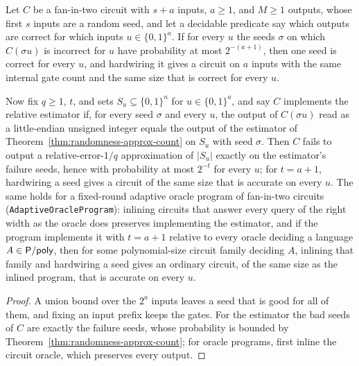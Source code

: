 \begin{corollary}
  \label{cor:randomness-approx-count-hardwire}
  \leanok
  Let $C$ be a fan-in-two circuit with $s + a$ inputs, $a \ge 1$, and $M \ge 1$
  outputs, whose first $s$ inputs are a random seed, and let a decidable
  predicate say which outputs are correct for which inputs
  $u \in \{0,1\}^a$. If for every $u$ the seeds $\sigma$ on which $C(\sigma u)$
  is incorrect for $u$ have probability at most $2^{-(a+1)}$, then one seed is
  correct for every $u$, and hardwiring it gives a circuit on $a$ inputs with
  the same internal gate count and the same size that is correct for every
  $u$.

  Now fix $q \ge 1$, $t$, and sets $S_u \subseteq \{0,1\}^n$ for
  $u \in \{0,1\}^a$, and say $C$ implements the relative estimator if, for
  every seed $\sigma$ and every $u$, the output of $C(\sigma u)$ read as a
  little-endian unsigned integer equals the output of the estimator of
  Theorem~\ref{thm:randomness-approx-count} on $S_u$ with seed $\sigma$. Then
  $C$ fails to output a relative-error-$1/q$ approximation of $|S_u|$ exactly on
  the estimator's failure seeds, hence with probability at most $2^{-t}$ for
  every $u$; for $t = a + 1$, hardwiring a seed gives a circuit of the same size
  that is accurate on every $u$. The same holds for a fixed-round adaptive
  oracle program of fan-in-two circuits (\texttt{AdaptiveOracleProgram}):
  inlining circuits that answer every query of the right width as the oracle
  does preserves implementing the estimator, and if the program implements it
  with $t = a + 1$ relative to every oracle deciding a language
  $A \in \mathsf{P/poly}$, then for some polynomial-size circuit family deciding
  $A$, inlining that family and hardwiring a seed gives an ordinary circuit,
  of the same size as the inlined program, that is accurate on every $u$.
\end{corollary}
\begin{proof}
  \leanok
  A union bound over the $2^a$ inputs leaves a seed that is good for all of
  them, and fixing an input prefix keeps the gates. For the estimator the bad
  seeds of $C$ are exactly the failure seeds, whose probability is bounded by
  Theorem~\ref{thm:randomness-approx-count}; for oracle programs, first inline
  the circuit oracle, which preserves every output.
\end{proof}

